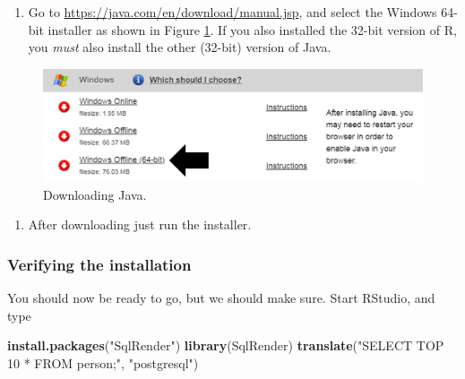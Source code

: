 \documentclass[11pt]{book}
\newenvironment{Shaded}{\begin{snugshade}}{\end{snugshade}}
\newcommand{\KeywordTok}[1]{\textcolor[rgb]{0.13,0.29,0.53}{\textbf{#1}}}
\newcommand{\NormalTok}[1]{#1}
\newcommand{\StringTok}[1]{\textcolor[rgb]{0.31,0.60,0.02}{#1}}
\providecommand{\tightlist}{%
  \setlength{\itemsep}{0pt}\setlength{\parskip}{0pt}}
\theoremstyle{definition}
\theoremstyle{definition}
\theoremstyle{definition}
\theoremstyle{remark}
\begin{document}
\begin{enumerate}
\def\labelenumi{\arabic{enumi}.}
\tightlist
\item
  Go to \url{https://java.com/en/download/manual.jsp}, and select the Windows 64-bit installer as shown in Figure \ref{fig:downloadJava}. If you also installed the 32-bit version of R, you \emph{must} also install the other (32-bit) version of Java.
\end{enumerate}

\begin{figure}

{\centering \includegraphics[width=1\linewidth]{images/OhdsiAnalyticsTools/downloadJava} 

}

\caption{Downloading Java.}\label{fig:downloadJava}
\end{figure}

\begin{enumerate}
\def\labelenumi{\arabic{enumi}.}
\setcounter{enumi}{1}
\tightlist
\item
  After downloading just run the installer.
\end{enumerate}

\hypertarget{verifying-the-installation}{%
\subsubsection*{Verifying the installation}\label{verifying-the-installation}}

You should now be ready to go, but we should make sure. Start RStudio, and type

\begin{Shaded}
\begin{Highlighting}[]
\KeywordTok{install.packages}\NormalTok{(}\StringTok{"SqlRender"}\NormalTok{)}
\KeywordTok{library}\NormalTok{(SqlRender)}
\KeywordTok{translate}\NormalTok{(}\StringTok{"SELECT TOP 10 * FROM person;"}\NormalTok{, }\StringTok{"postgresql"}\NormalTok{)}
\end{Highlighting}
\end{Shaded}
\end{document}
